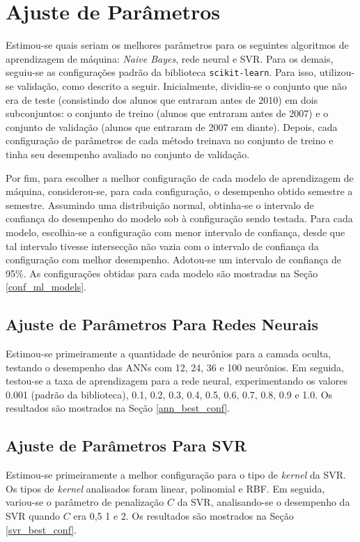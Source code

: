 \section{Ajuste de Parâmetros}
Estimou-se quais seriam os melhores parâmetros para os seguintes algoritmos de
aprendizagem de máquina: \textit{Naive Bayes}, rede neural e SVR. Para os demais,
seguiu-se as configurações padrão da biblioteca \texttt{scikit-learn}.  
Para isso, utilizou-se validação, como descrito a seguir. Inicialmente, dividiu-se o
conjunto que não era de teste (consistindo dos alunos que entraram antes de 2010) em
dois subconjuntos: o conjunto de treino (alunos que entraram antes de 2007) e o
conjunto de validação (alunos que entraram de 2007 em diante). Depois, cada
configuração de parâmetros de cada método treinava no conjunto de treino e tinha seu
desempenho avaliado no conjunto de validação. 
\par Por fim, para escolher a melhor configuração de cada modelo de aprendizagem de
máquina, considerou-se, para cada configuração, o desempenho obtido semestre a
semestre.  Assumindo uma distribuição normal,
obtinha-se o intervalo de confiança do desempenho do modelo sob à configuração sendo
testada.  Para cada modelo, escolhia-se a configuração com menor intervalo de
confiança, desde que tal intervalo tivesse intersecção não vazia com o intervalo de
confiança da configuração com melhor desempenho. Adotou-se um intervalo de confiança
de 95\%.  As configurações obtidas para cada modelo são mostradas na Seção
\ref{conf_ml_models}.

\subsection{Ajuste de Parâmetros Para Redes Neurais}
Estimou-se primeiramente a quantidade de neurônios para a camada oculta, testando o
desempenho das \acrshort{ANN}s com 12, 24, 36 e 100 neurônios.
Em seguida, testou-se a taxa de aprendizagem para a rede neural, experimentando os
valores 0.001 (padrão da biblioteca), 0.1, 0.2, 0.3, 0.4, 0.5, 0.6, 0.7, 0.8, 0.9 e
1.0. Os resultados são mostrados na Seção \ref{ann_best_conf}.

\subsection{Ajuste de Parâmetros Para SVR}
Estimou-se primeiramente a melhor configuração para o tipo de \textit{kernel} da
\acrshort{SVR}. Os tipos de \textit{kernel} analisados foram linear, polinomial e RBF. Em
seguida, variou-se o parâmetro de penalização $C$ da SVR, analisando-se o desempenho da
SVR quando $C$ era 0,5 1 e 2. Os resultados são mostrados na Seção
\ref{svr_best_conf}. 


